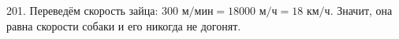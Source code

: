 201. Переведём скорость зайца: $300\text{ м/мин}=18000\text{ м/ч}=18\text{ км/ч.}$ Значит, она равна скорости собаки и его никогда не догонят.\\
